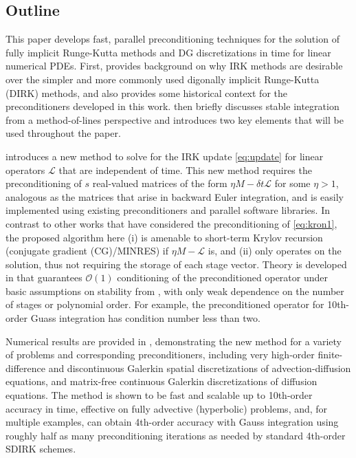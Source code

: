 \documentclass[review]{siamart}
\begin{document}
\subsection{Outline}\label{sec:intro:outline}

This paper develops fast, parallel preconditioning techniques for the solution of fully implicit
Runge-Kutta methods and DG discretizations in time for linear numerical PDEs. First,
 provides background on why IRK methods are desirable over the simpler and more
commonly used digonally implicit Runge-Kutta (DIRK) methods, and also provides some historical
context for the preconditioners developed in this work.  then briefly discusses
stable integration from a method-of-lines perspective and introduces two key elements that will be
used throughout the paper.

 introduces a new method to solve for the IRK update
\eqref{eq:update} for linear operators $\mathcal{L}$ that are independent of time.
This new method requires the preconditioning of $s$ real-valued matrices of the form
$\eta M - \delta t\mathcal{L}$ for some $\eta > 1$, analogous as the matrices that
arise in backward Euler integration, and is easily implemented
using existing preconditioners and parallel software libraries.
In contrast to other works that have considered the preconditioning of \eqref{eq:kron1},
the proposed algorithm here (i) is amenable to short-term Krylov recursion (conjugate
gradient (CG)/MINRES) if $\eta M - \mathcal{L}$ is, and (ii) only operates on the solution,
thus not requiring the storage of each stage vector. Theory is developed in
 that guarantees $\mathcal{O}(1)$ conditioning of the
preconditioned operator under basic assumptions on stability from
, with only weak dependence on the number of
stages or polynomial order. For example, the preconditioned operator for
10th-order Guass integration has condition number less than two.

Numerical results are provided in , demonstrating the new
method for a variety of problems and corresponding preconditioners, including
very high-order finite-difference and discontinuous Galerkin spatial discretizations of
advection-diffusion equations, and matrix-free continuous Galerkin
discretizations of diffusion equations. The method is shown to be fast and scalable
up to 10th-order accuracy in time, effective on fully advective (hyperbolic)
problems, and, for multiple examples, can obtain 4th-order accuracy with Gauss
integration using roughly half as many preconditioning iterations
as needed by standard 4th-order SDIRK schemes.
\end{document}
